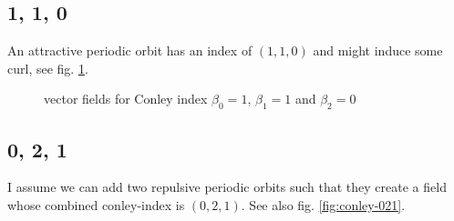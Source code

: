 \documentclass[a4paper,10pt,notitlepage]{scrartcl}
\begin{document}
\subsection*{1, 1, 0}

An attractive periodic orbit has an index of $(1, 1, 0)$ and might induce some
curl, see fig. \ref{fig:conley-110}.

\begin{figure}
  \centering
  \caption{vector fields for Conley index $\beta_0 = 1$, $\beta_1 = 1$ and
$\beta_2 = 0$}
  \label{fig:conley-110}
\end{figure}

\subsection*{0, 2, 1}

I assume we can add two repulsive periodic orbits such that they create a field
whose combined conley-index is $(0,2,1)$. See also fig. \ref{fig:conley-021}.
\end{document}
